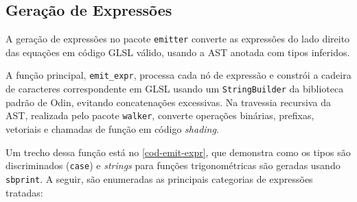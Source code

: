 \subsection{Geração de Expressões} \label{sec-RHS}

A geração de expressões no pacote \texttt{emitter} converte as expressões do lado direito das equações em código GLSL válido, usando a AST anotada com tipos inferidos.

A função principal, \verb"emit_expr", processa cada nó de expressão e constrói a cadeira de caracteres correspondente em GLSL usando um \verb"StringBuilder" da biblioteca padrão de Odin, evitando concatenações excessivas. Na travessia recursiva da AST, realizada pelo pacote \texttt{walker}, converte operações binárias, prefixas, vetoriais e chamadas de função em código \textit{shading}.

Um trecho dessa função está no \autoref{cod-emit-expr}, que demonstra como os tipos são discriminados (\texttt{case}) e \textit{strings} para funções trigonométricas são geradas usando \verb|sbprint|. A seguir, são enumeradas as principais categorias de expressões tratadas:

